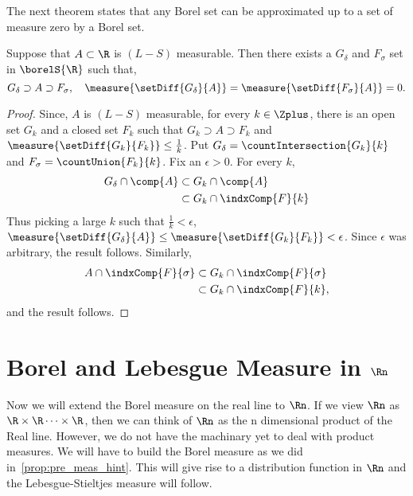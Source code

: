 The next theorem states that any Borel set can be approximated up to a set of measure zero by a
Borel set.
\begin{Theorem}[name=Borel Approximation]\label{thm:borel_approximation}
    Suppose that $A\subset \R$ is $(L-S)$ measurable. Then there exists a $G_{\delta}$ and
    $F_{\sigma}$ set in $\borelS{\R}$ such that,
    \[G_{\delta} \supset A \supset F_{\sigma}, \quad \measure{\setDiff{G_{\delta}}{A}} =
	    \measure{\setDiff{F_{\sigma}}{A}} = 0.\]
\end{Theorem}
\begin{proof}
    Since, $A$ is $(L-S)$ measurable, for every $k \in\Zplus$, there is an open set $G_k$ and a
    closed set $F_k$ such that $G_k \supset A \supset F_k$ and  
    $\measure{\setDiff{G_k}{F_k}} \leq \frac{1}{k}$. 
    Put $G_{\delta} = \countIntersection{G_k}{k}$ and $F_{\sigma} = \countUnion{F_k}{k}$.
    Fix an $\epsilon > 0$. For every $k$,
    \begin{align*}
	G_{\delta}\cap\comp{A} &\subset G_k\cap\comp{A}\\
	& \subset G_k \cap \indxComp{F}{k}
    \end{align*}
    Thus picking a large $k$ such that $\frac{1}{k} < \epsilon$,
    $\measure{\setDiff{G_{\delta}}{A}} \leq \measure{\setDiff{G_k}{F_k}} < \epsilon$. Since $\epsilon$ was
    arbitrary, the result follows.
    Similarly,
    \begin{align*}
	A\cap\indxComp{F}{\sigma} &\subset G_k\cap\indxComp{F}{\sigma}\\
	& \subset G_k \cap \indxComp{F}{k},
    \end{align*}
    and the result follows.
\end{proof}

\section{Borel and Lebesgue Measure in {$\Rn$}}
Now we will extend the Borel measure on the real line to $\Rn$. If we view $\Rn$ as $\R \times \R
\dots \times \R$, then we can think of $\Rn$ as the n dimensional product of the Real line. However,
we do not have the machinary yet to deal with product measures. We will have to build the Borel
measure as we did in~\ref{prop:pre_meas_hint}. This will give rise to a distribution function in
$\Rn$ and the Lebesgue-Stieltjes measure will follow. 

